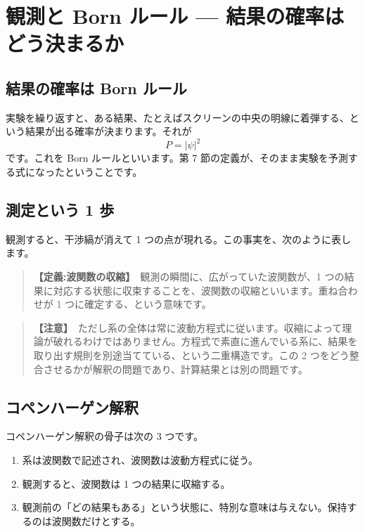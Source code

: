 \documentclass{article}
\begin{document}
\section{観測と Born ルール — 結果の確率はどう決まるか}

\subsection{結果の確率は Born ルール}

実験を繰り返すと、ある結果、たとえばスクリーンの中央の明線に着弾する、という結果が出る確率が決まります。それが
\[ P = |\psi|^2 \]
です。これを Born ルールといいます。第 7 節の定義が、そのまま実験を予測する式になったということです。

\subsection{測定という 1 歩}

観測すると、干渉縞が消えて 1 つの点が現れる。この事実を、次のように表します。

\begin{quote}
\textbf{【定義:波関数の収縮】}\ 観測の瞬間に、広がっていた波関数が、1 つの結果に対応する状態に収束することを、波関数の収縮といいます。重ね合わせが 1 つに確定する、という意味です。
\end{quote}

\begin{quote}
\textbf{【注意】}\ ただし系の全体は常に波動方程式に従います。収縮によって理論が破れるわけではありません。方程式で素直に進んでいる系に、結果を取り出す規則を別途当てている、という二重構造です。この 2 つをどう整合させるかが解釈の問題であり、計算結果とは別の問題です。
\end{quote}

\subsection{コペンハーゲン解釈}

コペンハーゲン解釈の骨子は次の 3 つです。
\begin{enumerate}
\item 系は波関数で記述され、波関数は波動方程式に従う。
\item 観測すると、波関数は 1 つの結果に収縮する。
\item 観測前の「どの結果もある」という状態に、特別な意味は与えない。保持するのは波関数だけとする。
\end{enumerate}
\end{document}
